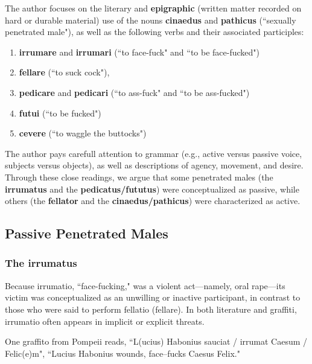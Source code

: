 The author focuses on the literary and \textbf{epigraphic} (written matter recorded on hard or durable material) use of the nouns \textbf{cinaedus} and \textbf{pathicus} (``sexually penetrated male"), as well as the following verbs and their associated participles: 
\begin{enumerate}
    \item \textbf{irrumare} and \textbf{irrumari} (``to face-fuck" and ``to be face-fucked")
    \item \textbf{fellare} (``to suck cock"),
    \item \textbf{pedicare} and \textbf{pedicari} (``to ass-fuck" and ``to be ass-fucked")
    \item \textbf{futui} (``to be fucked")
    \item \textbf{cevere} (``to waggle the buttocks")
\end{enumerate}

\begin{nte}
    The author pays carefull attention to grammar (e.g., active versus passive voice, subjects versus objects), as well as descriptions of agency, movement, and desire. Through these close readings, we argue that some penetrated males (the \textbf{irrumatus} and the \textbf{pedicatus/fututus}) were conceptualized as passive, while others (the \textbf{fellator} and the \textbf{cinaedus/pathicus}) were characterized as active.
\end{nte}


\subsection{Passive Penetrated Males}

\subsubsection{The irrumatus}

Because irrumatio, ``face-fucking," was a violent act---namely, oral rape---its victim was conceptualized as an unwilling or inactive participant, in contrast to those who were said to perform fellatio (fellare). In both literature and graffiti, irrumatio often appears in implicit or explicit threats.

\begin{eg}
    One graffito from Pompeii reads, ``L(ucius) Habonius sauciat / irrumat Caesum / Felic(e)m", ``Lucius Habonius wounds, face--fucks Caesus Felix."
\end{eg}

